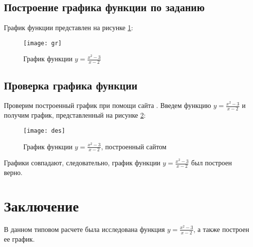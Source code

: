 \subsection{Построение графика функции по заданию}

График функции представлен на рисунке \ref{pic:gr}:

\begin{figure}[H]
	\begin{center}
		\texttt{[image: gr]}
		\caption{График функции $y = \frac{x^2-3}{x-2}$}
		\label{pic:gr} 
	\end{center}
\end{figure}

\subsection{Проверка графика функции}

Проверим построенный график при помощи сайта \cite{desmos}. Введем функцию $y = \frac{x^2-3}{x-2}$ и получим график, представленный на рисунке \ref{pic:des}:

\begin{figure}[H]
	\begin{center}
		\texttt{[image: des]}
		\caption{График функции $y = \frac{x^2-3}{x-2}$, построенный сайтом}
		\label{pic:des} 
	\end{center}
\end{figure}

Графики совпадают, следовательно, график функции $y = \frac{x^2-3}{x-2}$ был построен верно.

\newpage
\section*{Заключение}
В данном типовом расчете была исследована функция $y = \frac{x^2-3}{x-2}$, а также построен ее график.
